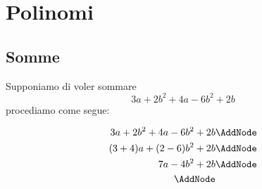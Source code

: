 \chapter{Polinomi}
\label{cha:polinomi}
\minitoc
\mtcskip                                %
\minilof                                %
\mtcskip                                %
\minilot
\section{Somme}
\label{sec:somme}
\begin{esempio}
Supponiamo di voler sommare\[ 3a+2b^2+4a-6b^2+2b\] procediamo come segue:
	 \begin{NodesList} %
	 	\begin{align*}
	 		3a+2b^2+4a-6b^2+2b&                           \AddNode\\
	 		(3+4)a+(2-6)b^2+2b&          \AddNode\\                                       		
	 		7a-4b^2+2b&   \AddNode\\
	 		\AddNode
	 	\end{align*}
	  \end{NodesList}
\end{esempio}
